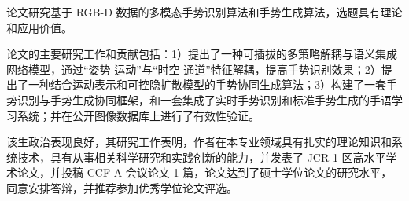 
\begin{comments}

论文研究基于 RGB-D 数据的多模态手势识别算法和手势生成算法，选题具有理论和应用价值。

论文的主要研究工作和贡献包括：1）提出了一种可插拔的多策略解耦与语义集成网络模型，通过“姿势-运动”与“时空-通道”特征解耦，提高手势识别效果；2）提出了一种结合运动表示和可控隐扩散模型的手势协同生成算法；3）构建了一套手势识别与手势生成协同框架，和一套集成了实时手势识别和标准手势生成的手语学习系统；并在公开图像数据库上进行了有效性验证。

该生政治表现良好，其研究工作表明，作者在本专业领域具有扎实的理论知识和系统技术，具有从事相关科学研究和实践创新的能力，并发表了 JCR-1 区高水平学术论文，并投稿 CCF-A 会议论文 1 篇，论文达到了硕士学位论文的研究水平，同意安排答辩，并推荐参加优秀学位论文评选。
\end{comments}
